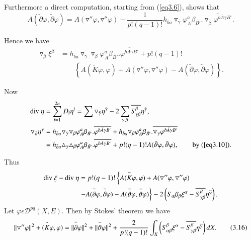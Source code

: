 Furthermore a direct computation, starting from (\ref{eq3.6}), shows that
$$ 
A(\tilde{\partial} \varphi, \tilde{\partial} \varphi) = A (
\triangledown '' \varphi , \triangledown '' \varphi) -
\frac{1}{p!(q-1)!}h_{\bar{b}a} \triangledown_{\bar{\gamma}}
\varphi^{a}_{A} \beta_{\bar{B'}}.\overline{\triangledown_{\bar{\beta}}
\varphi^{b\bar{A}\gamma B'}}.
$$

Hence we have 
\begin{align*}
\triangledown_{\beta}\xi^{\beta} &= h_{\bar{b}a}
\triangledown_{\bar{\gamma}} \triangledown_{\beta}
\varphi^{a}_{A}\beta_{\bar{B'}}. \overline{\varphi^{b\bar{A}\gamma
    B'}} + p!(q-1)!\\ 
&\qquad\left\{A(\tilde{K} \varphi,\varphi) + A(\triangledown''
\varphi,  \triangledown'' \varphi)- A (\tilde{\partial}\varphi,
\tilde{\partial}\varphi)\right\}.
\end{align*}

Now
\begin{align*} 
  \text{div}~ \eta & = \displaystyle \sum_{i=1}^{2n}D_{i} \eta^{i} = \sum
  \triangledown_ {\bar{\gamma}} \eta^{\bar{\gamma}} - 2
  \sum_{\gamma,\beta} \overline{S^{\beta}_{\gamma \beta}}\eta^{\bar{\gamma}},\\
  \triangledown_{\bar{\partial}}\eta^{\bar{\gamma}} &=
  h_{\bar{b}a} \triangledown_{\bar{\gamma}} \triangledown_{\beta}
  \varphi^{a}_{A} \beta_{\bar{B'}}.\overline{\varphi^{b\bar{A}\gamma 
  B'}} + h_{\bar{b}a} \triangledown_{\beta} \varphi^{a}_{A}
  \beta_{\bar{B'}}. \overline{\triangledown_{\gamma} \varphi^{b\bar{A}\gamma
    B'}}\\
& =h_{\bar{b}a} \triangle_{\bar{\gamma}} \triangle_{\beta}
  \varphi^{a}_{A} \beta_{\bar{B'}}.\overline{\varphi^{b\bar{A}\gamma
    B'}}+ p!(q-1)!A(\tilde{\vartheta} \varphi,\tilde{\vartheta}
  \varphi),\qquad \text{by (\ref{eq3.10}).}
\end{align*}


Thus\pageoriginale
\begin{align*}
  \text{div}~ \xi - \text{div}~ \eta &= p! (q-1) ! \left\{
  A(\overset{\thicksim} {K}  \varphi,\varphi) + A (\triangledown''
  \varphi,  \triangledown'' \varphi)\right.\\  
  &\left.-A (\overset{\thicksim}
  \partial \varphi, \overset{\thicksim} \partial \varphi) - A
  (\overset{\thicksim} \vartheta \varphi, \overset{\thicksim}
  \vartheta  \varphi)\right\}
  -2 \left(S_\alpha \beta_\beta \xi^\alpha -
  \overline{S^\beta_{\gamma\beta}}\eta\overline{^\gamma}\right). 
\end{align*}
Let $\varphi \epsilon \mathscr{D}^{pq} (X,E)$. Then by Stokes' theorem 
we have  
\begin{equation*}
  \|\triangledown'' \varphi\|^2 +
  (\overset{\thicksim}{K}\varphi,\varphi)  =  \|\overset{\thicksim}
  \partial \varphi\|^2 + \|\overset{\thicksim} \vartheta \varphi\|^2
  + \frac{2}{p!(q-1)!} \int_X \left(S_{\alpha \beta}^{\beta} \xi^\alpha -
  \overline{S^\beta  _{\gamma\beta}}\eta\overline{^\gamma}\right)dX.
  \tag{3.16}\label{eq3.16} 
\end{equation*}

